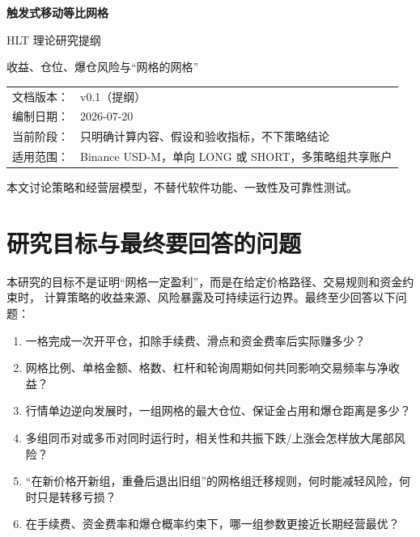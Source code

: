 \documentclass[11pt,a4paper,fontset=none]{ctexart}
\begin{document}
\begin{titlepage}
  \centering
  \vspace*{3.2cm}
  {\Huge\bfseries 触发式移动等比网格\par}
  \vspace{0.6cm}
  {\LARGE HLT 理论研究提纲\par}
  \vspace{1.0cm}
  {\large 收益、仓位、爆仓风险与“网格的网格”\par}
  \vfill
  \begin{tabular}{rl}
    文档版本： & v0.1（提纲） \\
    编制日期： & 2026-07-20 \\
    当前阶段： & 只明确计算内容、假设和验收指标，不下策略结论 \\
    适用范围： & Binance USD-M，单向 LONG 或 SHORT，多策略组共享账户 \\
  \end{tabular}
  \vfill
  {\small 本文讨论策略和经营层模型，不替代软件功能、一致性及可靠性测试。\par}
\end{titlepage}

\tableofcontents
\clearpage
{}

\section{研究目标与最终要回答的问题}

本研究的目标不是证明“网格一定盈利”，而是在给定价格路径、交易规则和资金约束时，
计算策略的收益来源、风险暴露及可持续运行边界。最终至少回答以下问题：

\begin{enumerate}
  \item 一格完成一次开平仓，扣除手续费、滑点和资金费率后实际赚多少？
  \item 网格比例、单格金额、格数、杠杆和轮询周期如何共同影响交易频率与净收益？
  \item 行情单边逆向发展时，一组网格的最大仓位、保证金占用和爆仓距离是多少？
  \item 多组同币对或多币对同时运行时，相关性和共振下跌/上涨会怎样放大尾部风险？
  \item “在新价格开新组，重叠后退出旧组”的网格组迁移规则，何时能减轻风险，何时只是转移亏损？
  \item 在手续费、资金费率和爆仓概率约束下，哪一组参数更接近长期经营最优？
\end{enumerate}
\end{document}
